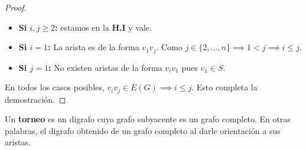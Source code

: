 \begin{proof}
	\begin{itemize}
		\item \textbf{Si \( i, j \ge 2 \):} estamos en la \textbf{H.I} y vale.
		\item \textbf{Si \( i = 1 \):} La arista es de la forma \( v_1 v_j \). Como \( j \in \{2, \ldots, n\} \implies 1 < j \implies i \le j \).
		\item \textbf{Si \( j = 1 \):} No existen aristas de la forma \( v_i v_1 \) pues \( v_1 \in S \).
	\end{itemize}

	En todos los casos posibles, \( v_i v_j \in E(G) \implies i \le j \). Esto completa la demostración.
\end{proof}

\vspace{0.5cm}

\begin{definition}
	Un \textbf{torneo} es un digrafo cuyo grafo subyacente es un grafo completo. En otras palabras, el digrafo obtenido de un grafo completo al darle orientación a sus aristas.
\end{definition}


